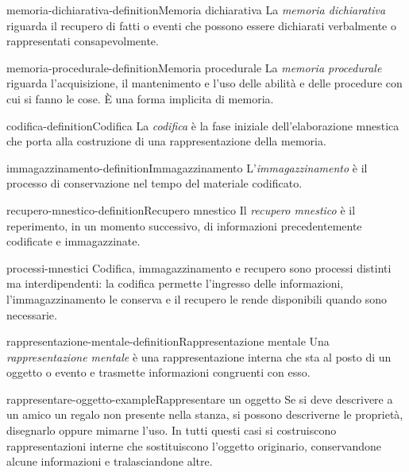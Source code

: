 \documentclass[preview]{standalone}
\begin{document}
\begin{snippetdefinition}{memoria-dichiarativa-definition}{Memoria dichiarativa}
    La \emph{memoria dichiarativa} riguarda il recupero di fatti o eventi che
    possono essere dichiarati verbalmente o rappresentati consapevolmente.
\end{snippetdefinition}

\begin{snippetdefinition}{memoria-procedurale-definition}{Memoria procedurale}
    La \emph{memoria procedurale} riguarda l'acquisizione, il mantenimento e
    l'uso delle abilità e delle procedure con cui si fanno le cose. È una forma
    implicita di memoria.
\end{snippetdefinition}

\begin{snippetdefinition}{codifica-definition}{Codifica}
    La \emph{codifica} è la fase iniziale dell'elaborazione mnestica che porta
    alla costruzione di una rappresentazione della memoria.
\end{snippetdefinition}

\begin{snippetdefinition}{immagazzinamento-definition}{Immagazzinamento}
    L'\emph{immagazzinamento} è il processo di conservazione nel tempo del
    materiale codificato.
\end{snippetdefinition}

\begin{snippetdefinition}{recupero-mnestico-definition}{Recupero mnestico}
    Il \emph{recupero mnestico} è il reperimento, in un momento successivo, di
    informazioni precedentemente codificate e immagazzinate.
\end{snippetdefinition}

\begin{snippet}{processi-mnestici}
    Codifica, immagazzinamento e recupero sono processi distinti ma
    interdipendenti: la codifica permette l'ingresso delle informazioni,
    l'immagazzinamento le conserva e il recupero le rende disponibili quando
    sono necessarie.
\end{snippet}

\begin{snippetdefinition}{rappresentazione-mentale-definition}{Rappresentazione mentale}
    Una \emph{rappresentazione mentale} è una rappresentazione interna che sta al
    posto di un oggetto o evento e trasmette informazioni congruenti con esso.
\end{snippetdefinition}

\begin{snippetexample}{rappresentare-oggetto-example}{Rappresentare un oggetto}
    Se si deve descrivere a un amico un regalo non presente nella stanza, si
    possono descriverne le proprietà, disegnarlo oppure mimarne l'uso. In tutti
    questi casi si costruiscono rappresentazioni interne che sostituiscono
    l'oggetto originario, conservandone alcune informazioni e tralasciandone
    altre.
\end{snippetexample}
\end{document}

